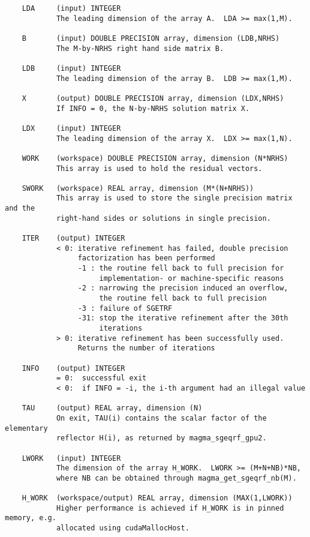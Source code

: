 \documentclass[10pt]{book}
\begin{document}
\begin{verbatim}
    LDA     (input) INTEGER
            The leading dimension of the array A.  LDA >= max(1,M).

    B       (input) DOUBLE PRECISION array, dimension (LDB,NRHS)
            The M-by-NRHS right hand side matrix B.

    LDB     (input) INTEGER
            The leading dimension of the array B.  LDB >= max(1,M).

    X       (output) DOUBLE PRECISION array, dimension (LDX,NRHS)
            If INFO = 0, the N-by-NRHS solution matrix X.

    LDX     (input) INTEGER
            The leading dimension of the array X.  LDX >= max(1,N).

    WORK    (workspace) DOUBLE PRECISION array, dimension (N*NRHS)
            This array is used to hold the residual vectors.

    SWORK   (workspace) REAL array, dimension (M*(N+NRHS))
            This array is used to store the single precision matrix and the
            right-hand sides or solutions in single precision.

    ITER    (output) INTEGER
            < 0: iterative refinement has failed, double precision
                 factorization has been performed
                 -1 : the routine fell back to full precision for
                      implementation- or machine-specific reasons
                 -2 : narrowing the precision induced an overflow,
                      the routine fell back to full precision
                 -3 : failure of SGETRF
                 -31: stop the iterative refinement after the 30th
                      iterations
            > 0: iterative refinement has been successfully used.
                 Returns the number of iterations
 
    INFO    (output) INTEGER
            = 0:  successful exit
            < 0:  if INFO = -i, the i-th argument had an illegal value

    TAU     (output) REAL array, dimension (N)
            On exit, TAU(i) contains the scalar factor of the elementary
            reflector H(i), as returned by magma_sgeqrf_gpu2.

    LWORK   (input) INTEGER   
            The dimension of the array H_WORK.  LWORK >= (M+N+NB)*NB,   
            where NB can be obtained through magma_get_sgeqrf_nb(M).

    H_WORK  (workspace/output) REAL array, dimension (MAX(1,LWORK))   
            Higher performance is achieved if H_WORK is in pinned memory, e.g.
            allocated using cudaMallocHost.


\end{verbatim}
\end{document}
